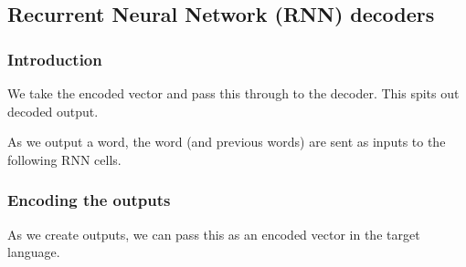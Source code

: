 
\subsection{Recurrent Neural Network (RNN) decoders}

\subsubsection{Introduction}

We take the encoded vector and pass this through to the decoder. This spits out decoded output.

As we output a word, the word (and previous words) are sent as inputs to the following RNN cells.

\subsubsection{Encoding the outputs}

As we create outputs, we can pass this as an encoded vector in the target language.

